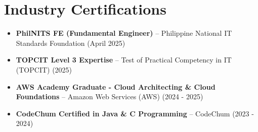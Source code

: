 \documentclass[letterpaper,10pt]{article}
\begin{document}
\section{Industry Certifications}
\begin{itemize}
  \item \textbf{PhilNITS FE (Fundamental Engineer)} -- Philippine National IT Standards Foundation (April 2025)
  \item \textbf{TOPCIT Level 3 Expertise} -- Test of Practical Competency in IT (TOPCIT) (2025)
  \item \textbf{AWS Academy Graduate - Cloud Architecting \& Cloud Foundations} -- Amazon Web Services (AWS) (2024 - 2025)
  \item \textbf{CodeChum Certified in Java \& C Programming} -- CodeChum (2023 - 2024)
\end{itemize}
\end{document}
